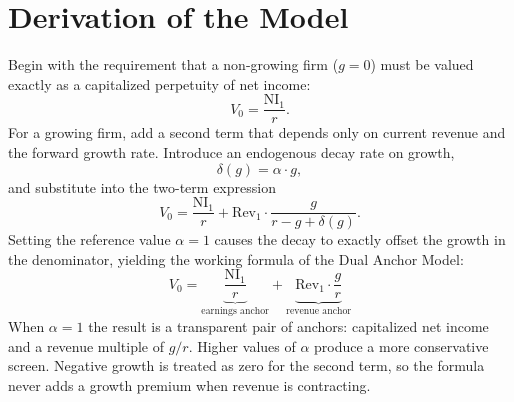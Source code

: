 \documentclass[11pt]{article}
\begin{document}
\section{Derivation of the Model}
Begin with the requirement that a non-growing firm (\(g = 0\)) must be valued exactly as a capitalized perpetuity of net income:
\begin{equation}
V_0 = \frac{\mathrm{NI}_1}{r}.
\end{equation}
For a growing firm, add a second term that depends only on current revenue and the forward growth rate. Introduce an endogenous decay rate on growth,
\begin{equation}
\delta(g) = \alpha \cdot g,
\end{equation}
and substitute into the two-term expression
\begin{equation}
V_0 = \frac{\mathrm{NI}_1}{r} + \mathrm{Rev}_1 \cdot \frac{g}{r - g + \delta(g)}.
\end{equation}
Setting the reference value \(\alpha = 1\) causes the decay to exactly offset the growth in the denominator, yielding the working formula of the Dual Anchor Model:
\begin{equation}
V_0 = \underbrace{\frac{\mathrm{NI}_1}{r}}_{\text{earnings anchor}} + \underbrace{\mathrm{Rev}_1 \cdot \frac{g}{r}}_{\text{revenue anchor}}
\end{equation}
When \(\alpha = 1\) the result is a transparent pair of anchors: capitalized net income and a revenue multiple of \(g/r\). Higher values of \(\alpha\) produce a more conservative screen. Negative growth is treated as zero for the second term, so the formula never adds a growth premium when revenue is contracting.
\end{document}
